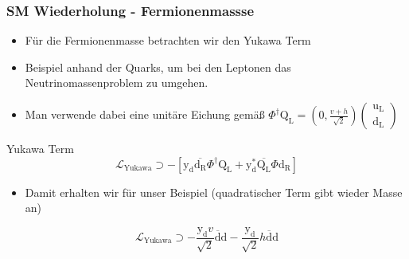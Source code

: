 \documentclass{beamer}
\begin{document}
\begin{frame}
\frametitle{SM Wiederholung - Fermionenmassse}
\begin{itemize}
\item Für die Fermionenmasse betrachten wir den Yukawa Term
\item Beispiel anhand der Quarks, um bei den Leptonen das Neutrinomassenproblem zu umgehen. 
\item Man verwende dabei eine unitäre Eichung gemäß $\Phi^{\dagger}\text{Q}_{\text{L}}=\left(  0, \frac{v+h}{\sqrt{2}} \right)\left( \begin{array}{c} \text{u}_{\text{L}}\\ \text{d}_{\text{L}} \end{array}\right) $
\end{itemize}
\begin{block}{Yukawa Term}
\begin{equation*}
\mathscr{L}_{\text{Yukawa}}\supset -[\text{y}_{\text{d}}\overline{\text{d}_{\text{R}}} \Phi^{\dagger}\text{Q}_{\text{L}}+\text{y}_{\text{d}}^{*} \overline{\text{Q}_{\text{L}}}\Phi \text{d}_{\text{R}}]
\end{equation*}
\end{block}
\begin{itemize}
\item Damit erhalten wir für unser Beispiel (quadratischer Term gibt wieder Masse an)
\end{itemize}
\begin{equation*}
\mathscr{L}_{\text{Yukawa}}\supset -\frac{\text{y}_{\text{d}}v}{\sqrt{2}}\overline{\text{d}} \text{d} - \frac{\text{y}_{\text{d}}}{\sqrt{2}}h\overline{\text{d}} \text{d} 
\end{equation*}
\end{frame}
\end{document}
